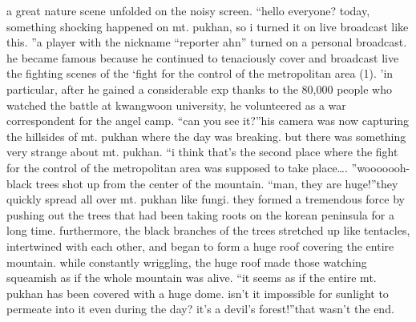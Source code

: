 a great nature scene unfolded on the noisy screen.
“hello everyone? today, something shocking happened on mt.
 pukhan, so i turned it on live broadcast like this.
”a player with the nickname “reporter ahn” turned on a personal broadcast.
 he became famous because he continued to tenaciously cover and broadcast live the fighting scenes of the ‘fight for the control of the metropolitan area (1).
’in particular, after he gained a considerable exp thanks to the 80,000 people who watched the battle at kwangwoon university, he volunteered as a war correspondent for the angel camp.
“can you see it?”his camera was now capturing the hillsides of mt.
 pukhan where the day was breaking.
but there was something very strange about mt.
 pukhan.
“i think that’s the second place where the fight for the control of the metropolitan area was supposed to take place….
”wooooooh-black trees shot up from the center of the mountain.
“man, they are huge!”they quickly spread all over mt.
 pukhan like fungi.
 they formed a tremendous force by pushing out the trees that had been taking roots on the korean peninsula for a long time.
furthermore, the black branches of the trees stretched up like tentacles, intertwined with each other, and began to form a huge roof covering the entire mountain.
while constantly wriggling, the huge roof made those watching squeamish as if the whole mountain was alive.
“it seems as if the entire mt.
 pukhan has been covered with a huge dome.
 isn’t it impossible for sunlight to permeate into it even during the day? it’s a devil’s forest!”that wasn’t the end.


 